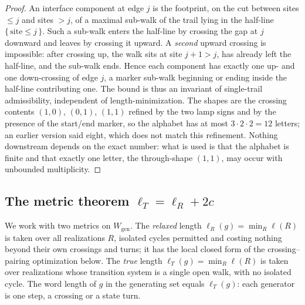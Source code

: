 \documentclass[11pt]{article}
\theoremstyle{plain}
\theoremstyle{definition}
\theoremstyle{remark}
\begin{document}
\begin{proof}
An interface component at edge $j$ is the footprint, on the cut between sites
$\le j$ and sites $>j$, of a maximal sub-walk of the trail lying in the
half-line $\{\,\text{site}\le j\,\}$. Such a sub-walk enters the half-line by
crossing the gap at $j$ downward and leaves by crossing it upward. A
\emph{second} upward crossing is impossible: after crossing up, the walk sits
at site $j+1>j$, has already left the half-line, and the sub-walk ends. Hence
each component has exactly one up- and one down-crossing of edge $j$, a marker
sub-walk beginning or ending inside the half-line contributing one. The bound
is thus an invariant of single-trail admissibility, independent of
length-minimization. The shapes are the crossing contents $(1,0)$, $(0,1)$, $(1,1)$ refined by the
two lamp signs and by the presence of the start/end marker, so the alphabet has
at most $3\cdot2\cdot2 = 12$ letters; an earlier version said eight, which does
not match this refinement. Nothing downstream depends on the exact number: what
is used is that the alphabet is finite and that exactly one letter, the
through-shape $(1,1)$, may occur with unbounded multiplicity.
\end{proof}

\subsection{The metric theorem $\ell_T=\ell_R+2c$}

We work with two metrics on $W_{\mathrm{gen}}$. The \emph{relaxed} length
$\ell_R(g)=\min_R\ell(R)$ is taken over all realizations $R$, isolated cycles
permitted and costing nothing beyond their own crossings and turns; it has the
local closed form of the crossing--pairing optimization below. The \emph{true}
length $\ell_T(g)=\min_R\ell(R)$ is taken over realizations whose transition
system is a single open walk, with no isolated cycle. The word length of $g$ in
the generating set equals $\ell_T(g)$: each generator is one step, a crossing
or a state turn.
\end{document}
